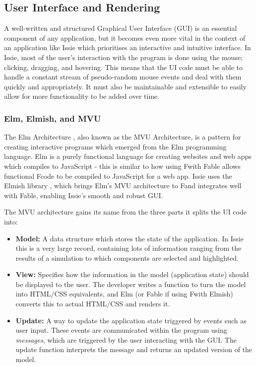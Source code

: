 \subsection{User Interface and Rendering}
A well-written and structured Graphical User Interface (GUI) is an essential component of any application, but it becomes even more vital in the context of an application like Issie which prioritises an interactive and intuitive interface. In Issie, most of the user's interaction with the program is done using the mouse; clicking, dragging, and hovering. This means that the UI code must be able to handle a constant stream of pseudo-random mouse events and deal with them quickly and appropriately. It must also be maintainable and extensible to easily allow for more functionality to be added over time.

\subsubsection{Elm, Elmish, and MVU}
The Elm Architecture \cite{elmarch}, also known as the MVU Architecture, is a pattern for creating interactive programs which emerged from the Elm programming language. Elm \cite{elm} is a purely functional language for creating websites and web apps which compiles to JavaScript - this is similar to how using F\fsharp with Fable allows functional F\fsharp code to be compiled to JavaScript for a web app. Issie uses the Elmish library \cite{elmishdocs}, which brings Elm's MVU architecture to F\fsharp and integrates well with Fable, enabling Issie's smooth and robust GUI.

The MVU architecture gains its name from the three parts it splits the UI code into:
\begin{itemize}
    \item[] \textbf{Model:} A data structure which stores the state of the application. In Issie this is a very large record, containing lots of information ranging from the results of a simulation to which components are selected and highlighted.
    \item[] \textbf{View:} Specifies how the information in the model (application state) should be displayed to the user. The developer writes a function to turn the model into HTML/CSS equivalents, and Elm (or Fable if using F\fsharp with Elmish) converts this to actual HTML/CSS and renders it. 
    \item[] \textbf{Update:} A way to update the application state triggered by events such as user input. These events are communicated within the program using \textit{messages}, which are triggered by the user interacting with the GUI. The update function interprets the message and returns an updated version of the model. 
\end{itemize}

